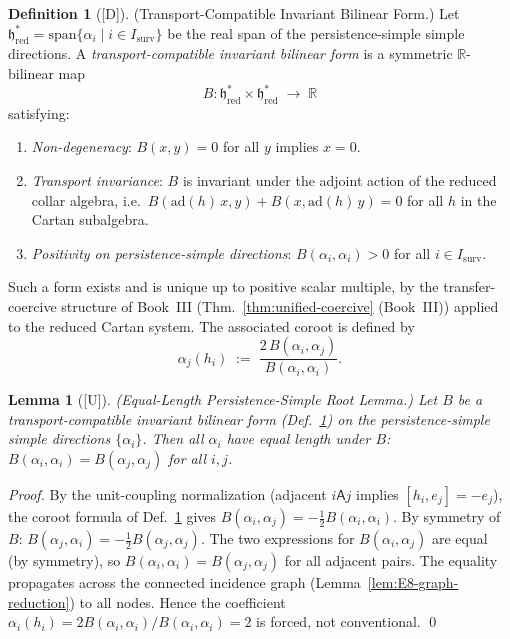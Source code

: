 \documentclass[12pt,oneside]{amsbook}
\theoremstyle{plain}
\newtheorem{lemma}[theorem]{Lemma}
\theoremstyle{definition}
\newtheorem{definition}[theorem]{Definition}
\theoremstyle{remark}
\newcommand{\status}[1]{\textup{[#1]}}
\begin{document}
\begin{definition}[\status{D}]\label{def:transport-compatible-bilinear}
\textup{(Transport-Compatible Invariant Bilinear Form.)}
Let $\mathfrak{h}^*_{\mathrm{red}} = \mathrm{span}\{\alpha_i \mid i \in
I_{\mathrm{surv}}\}$ be the real span of the persistence-simple simple
directions. A \emph{transport-compatible invariant bilinear form} is a
symmetric $\mathbb{R}$-bilinear map
\[
 B : \mathfrak{h}^*_{\mathrm{red}} \times \mathfrak{h}^*_{\mathrm{red}}
 \;\longrightarrow\; \mathbb{R}
\]
satisfying:
\begin{enumerate}[label=\textup{(\arabic*)}]
 \item \emph{Non-degeneracy}: $B(x,y) = 0$ for all $y$ implies $x = 0$.
 \item \emph{Transport invariance}: $B$ is invariant under the adjoint
 action of the reduced collar algebra, i.e.\ $B(\mathrm{ad}(h)\,x, y)
 + B(x, \mathrm{ad}(h)\,y) = 0$ for all $h$ in the Cartan subalgebra.
 \item \emph{Positivity on persistence-simple directions}: $B(\alpha_i,
 \alpha_i) > 0$ for all $i \in I_{\mathrm{surv}}$.
\end{enumerate}
Such a form exists and is unique up to positive scalar multiple, by the
transfer-coercive structure of Book~III (Thm.~\ref{thm:unified-coercive} (Book~III))
applied to the reduced Cartan system. The associated coroot is defined by
\[
 \alpha_j(h_i) \;:=\; \frac{2\,B(\alpha_i,\alpha_j)}{B(\alpha_i,\alpha_i)}.
\]
\end{definition}

\begin{lemma}[\status{U}]\label{lem:equal-length-roots}
\textup{(Equal-Length Persistence-Simple Root Lemma.)}
Let $B$ be a transport-compatible invariant bilinear form
(Def.~\ref{def:transport-compatible-bilinear}) on the
persistence-simple simple directions $\{\alpha_i\}$. Then all
$\alpha_i$ have equal length under $B$: $B(\alpha_i, \alpha_i) =
B(\alpha_j, \alpha_j)$ for all $i, j$.
\end{lemma}

\begin{proof}
By the unit-coupling normalization (adjacent $i \mathrel{\mathsf{A}} j$
implies $[h_i, e_j] = -e_j$), the coroot formula of
Def.~\ref{def:transport-compatible-bilinear} gives
$B(\alpha_i, \alpha_j) = -\tfrac{1}{2}B(\alpha_i,\alpha_i)$. By
symmetry of $B$: $B(\alpha_j,\alpha_i) = -\tfrac{1}{2}B(\alpha_j,
\alpha_j)$.  The two expressions for $B(\alpha_i,\alpha_j)$ are equal
(by symmetry), so $B(\alpha_i,\alpha_i) = B(\alpha_j,\alpha_j)$ for
all adjacent pairs. The equality propagates across the connected
incidence graph (Lemma~\ref{lem:E8-graph-reduction}) to all nodes.
Hence the coefficient $\alpha_i(h_i) = 2B(\alpha_i,\alpha_i)/
B(\alpha_i,\alpha_i) = 2$ is forced, not conventional. \qed
\end{proof}
\end{document}
